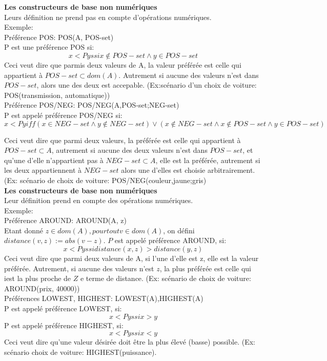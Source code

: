 \documentclass[a4paper,12pt,openany,oneside]{article}
\begin{document}
\textbf{Les constructeurs de base non numériques}\\
Leurs définition ne prend pas en compte d'opérations numériques. \\
Exemple:\\

Préférence POS:  POS(A, POS-set) \\
P est une préférence POS si:\\
\[  
              x <P y  ssi  x\notin POS-set \wedge y \in POS-set 
\]
Ceci veut dire que parmis deux valeurs de A, la valeur préférée est celle qui appartient à $POS-set\subset dom(A)$. Autrement si aucune des valeurs n'est dans $POS-set$, alors une des deux est accepable.
(Ex:scénario d'un choix de voiture: POS(transmission, {automatique})) \\
   
Préférence POS/NEG: POS/NEG(A,POS-set;NEG-set) \\
P est appelé préférence POS/NEG si: 
\[
x <P y  iff  (x \in NEG-set \wedge y\notin NEG-set) \vee (x \notin NEG-set \wedge x \notin POS-set \wedge y \in POS-set) 
\]

Ceci veut dire que parmi deux valeurs, la préférée est celle qui appartient à $POS-set\subset A$, autrement si aucune des deux valeurs n'est dans $POS-set$, et qu'une d'elle n'appartient pas à $NEG-set\subset A$, elle est la préférée, autrement si les deux appartiennent à $NEG-set$ alors une d'elles est choisie arbitrairement. (Ex: scénario de choix de voiture: POS/NEG(couleur,{jaune};{gris}) \\
 
\textbf{Les constructeurs de base non numériques}\\
Leur définition prend en compte des opérations numériques. \\
Exemple:    \\

Préférence AROUND: AROUND(A, z)\\
Etant donné $z \in dom(A), pour tout v \in dom(A)$, on défini $distance(v, z) := abs(v-z)$. $P$ est appelé préférence AROUND, si:
\[  
         x <P y   ssi   distance(x, z) > distance(y, z) 
\]
Ceci veut dire que parmi deux valeurs de A, si l'une d'elle est z, elle est la valeur préférée. Autrement, si aucune des valeurs n'est $z$, la plus préférée est celle qui iest la plus proche de $Z$ e terme de distance. (Ex: scénario de choix de voiture:  AROUND(prix, 40000))\\


Préférences LOWEST,  HIGHEST:  LOWEST(A),HIGHEST(A) \\
      P est appelé préférence LOWEST, si: 
\[
       x <P y   ssi   x > y
\]
      P est appelé préférence HIGHEST, si:
\[
 x <P y   ssi   x < y 
\]
Ceci veut dire qu'une valeur désirée doit être la plus élevé (basse) possible.  
(Ex: scénario choix de voiture:  HIGHEST(puissance).
\end{document}
